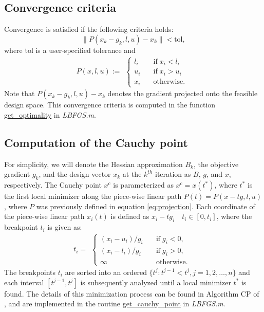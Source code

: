 \documentclass[11pt]{article}
\begin{document}
\subsection{Convergence criteria}

Convergence is satisfied if the following criteria holds:
%
\begin{equation}
\| P(x_k - g_k,l,u) - x_k \| < \text{tol},
\end{equation}
%
where tol is a user-specified tolerance and
%
\begin{equation}
P(x,l,u) := 
\begin{aligned}
\begin{cases}
l_i \quad & \text{if} \; x_i < l_i \\
u_i \quad & \text{if} \; x_i > u_i \\
x_i \quad & \text{otherwise}.
\end{cases}
\end{aligned}
\label{eq:projection}
\end{equation}
Note that $P(x_k - g_k,l,u) - x_k$ denotes
the gradient projected onto the feasible design space.
This convergence criteria is computed in the
function
\href{https://github.com/bgranzow/L-BFGS-B/blob/master/LBFGSB.m#L201}
{get\_optimality} in \emph{LBFGS.m}.

\subsection{Computation of the Cauchy point}

For simplicity, we will denote the Hessian
approximation $B_k$, the objective gradient
$g_k$, and the design vector $x_k$ at the $k^{th}$
iteration as $B$, $g$, and $x$, respectively.
The Cauchy point $x^c$ is parameterized
as $x^c = x(t^*)$, where $t^*$ is the first
local minimizer along the piece-wise linear
path $P(t) = P(x-tg,l,u)$, where $P$ was previously
defined in equation \eqref{eq:projection}.
Each coordinate of the piece-wise linear path
$x_i(t)$ is defined as $x_i - t g_i \quad t_i \in [0, t_i]$,
where the breakpoint $t_i$ is given as:
%
\begin{equation}
t_i =
\begin{aligned}
\begin{cases}
(x_i - u_i) / g_i \quad & \text{if} \; g_i < 0, \\
(x_i - l_i) / g_i \quad & \text{if} \; g_i > 0, \\
\infty \quad & \text{otherwise}.
\end{cases}
\end{aligned}
\end{equation}
%
The breakpoints $t_i$ are sorted into an ordered
$\{t^j : t^{j-1} < t^j, j=1,2,\dots,n \}$
and each interval $[t^{j-1},t^j]$ is subsequently
analyzed until a local minimizer $t^*$ is found.
The details of this minimization process can
be found in Algorithm CP of \cite{lbfgsb}, and
are implemented in the routine
\href{https://github.com/bgranzow/L-BFGS-B/blob/master/LBFGSB.m#L261}
{get\_cauchy\_point} in \emph{LBFGS.m}.
\end{document}
